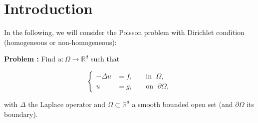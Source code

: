 \section{Introduction}

In the following, we will consider the Poisson problem with Dirichlet condition (homogeneous or non-homogeneous):

\textbf{Problem :} Find $u : \Omega \rightarrow \mathbb{R}^d$ such that

\begin{equation*}
	\left\{
		\begin{aligned}
			-\Delta u &= f, \; &&\text{in } \; \Omega, \\
			u&=g, \; &&\text{on } \; \partial\Omega,
		\end{aligned}
	\right.
\end{equation*}

with $\Delta$ the Laplace operator and $\Omega\subset\mathbb{R}^d$ a smooth bounded open set (and $\partial\Omega$ its boundary).
